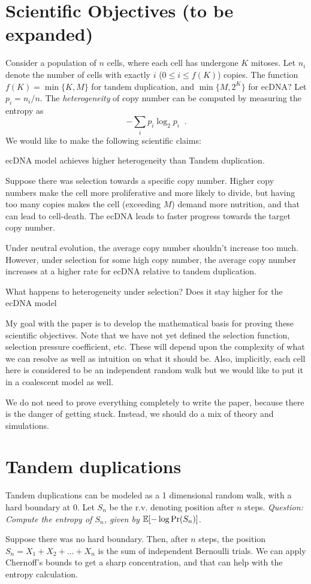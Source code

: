 \documentclass[11pt]{article}
\begin{document}
\section{Scientific Objectives (to be expanded)}
Consider a population of $n$ cells, where each cell has undergone $K$ mitoses. Let $n_i$ denote the number of cells with exactly $i$ ($0\le i\le f(K)$) copies. The function $f(K)=\min\{K,M\}$ for tandem duplication, and $\min\{M,2^K\}$ for ecDNA? Let $p_i=n_i/n$. The \emph{heterogeneity} of copy number can be computed by measuring the entropy as
\[ -\sum_i p_i\log_2 p_i\;\;.
\]
We would like to make the following scientific claims:
\begin{packed_enum}
  \item ecDNA model achieves higher heterogeneity than Tandem duplication.
  \item Suppose there was selection towards a specific copy number. Higher copy numbers make the cell more proliferative and more likely to divide, but having too many copies makes the cell (exceeding $M$) demand more nutrition, and that can lead to cell-death. The ecDNA leads to faster progress towards the target copy number.
  \item Under neutral evolution, the average copy number shouldn't increase too much. However, under selection for some high copy number, the average copy number increases at a higher rate for ecDNA relative to tandem duplication.
  \item What happens to heterogeneity under selection? Does it stay higher for the ecDNA model 
\end{packed_enum}
My goal with the paper is to develop the mathematical basis for proving these scientific objectives. Note that we have not yet defined the selection function, selection pressure coefficient, etc. These will depend upon the complexity of what we can resolve as well as intuition on what it should be. Also, implicitly, each cell here is considered to be an independent random walk but we would like to put it in a coalescent model as well.

We do not need to prove everything completely to write the paper, because there is the danger of getting stuck. Instead, we should do a mix of theory and simulations.



\section{Tandem duplications}
\begin{packed_enum}
  \item Tandem duplications can be modeled as a 1 dimensional random
    walk, with a hard boundary at $0$. Let $S_n$ be the r.v. denoting
    position after $n$ steps. \emph{Question: Compute the entropy of $S_n$, given by
    $\mathbb{E}[-\log \Pr(S_n)]$}.
  \item Suppose there was no hard boundary. Then, after $n$ steps, the
    position $S_n=X_1+X_2+\ldots+X_n$ is the sum of independent
    Bernoulli trials. We can apply Chernoff's bounds to get a sharp
    concentration, and that can help with the entropy calculation.
\end{packed_enum}
\end{document}
